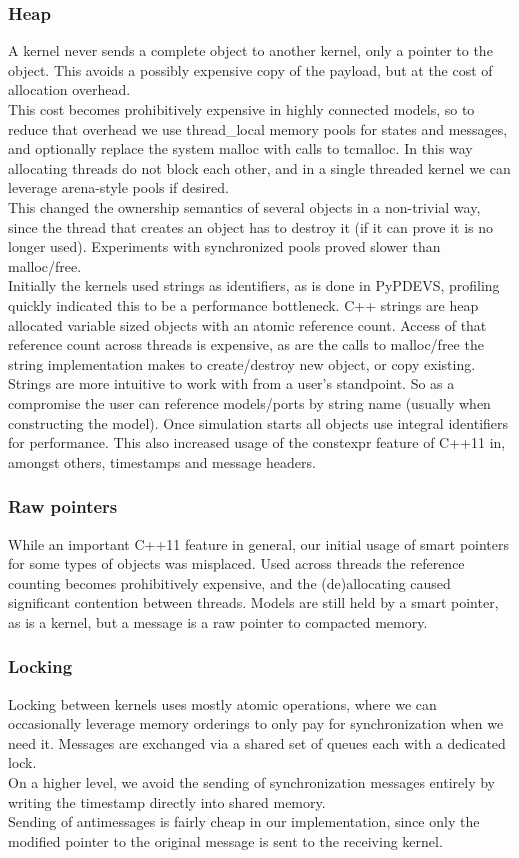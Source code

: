 \subsubsection{Heap}
A kernel never sends a complete object to another kernel, only a pointer to the object. This avoids a possibly expensive copy of the payload, but at the cost of allocation overhead.\\
This cost becomes prohibitively expensive in highly connected models, so to reduce that overhead we use thread\_local memory pools for states and messages, and optionally replace the system malloc with calls to tcmalloc\cite{tcmalloc}. In this way allocating threads do not block each other, and in a single threaded kernel we can leverage arena-style pools if desired.\\
This changed the ownership semantics of several objects in a non-trivial way, since the thread that creates an object has to destroy it (if it can prove it is no longer used). Experiments with synchronized pools proved slower than malloc/free. \\
Initially the kernels used strings as identifiers, as is done in PyPDEVS, profiling quickly indicated this to be a performance bottleneck. C++ strings are heap allocated variable sized objects with an atomic reference count. Access of that reference count across threads is expensive, as are the calls to malloc/free the string implementation makes to create/destroy new object, or copy existing.\\
Strings are more intuitive to work with from a user's standpoint. So as a compromise the user can reference models/ports by string name (usually when constructing the model). Once simulation starts all objects use integral identifiers for performance. This also increased usage of the constexpr feature of C++11 in, amongst others, timestamps and message headers.
\\
\subsubsection{Raw pointers}
While an important C++11 feature in general, our initial usage of smart pointers for some types of objects was misplaced. Used across threads the reference counting becomes prohibitively expensive, and the (de)allocating caused significant contention between threads. Models are still held by a smart pointer, as is a kernel, but a message is a raw pointer to compacted memory. 
\subsubsection{Locking}
Locking between kernels uses mostly atomic operations, where we can occasionally leverage memory orderings to only pay for synchronization when we need it. Messages are exchanged via a shared set of queues each with a dedicated lock.\\
On a higher level, we avoid the sending of synchronization messages entirely by writing the timestamp directly into shared memory.\\ Sending of antimessages is fairly cheap in our implementation, since only the modified pointer to the original message is sent to the receiving kernel.
